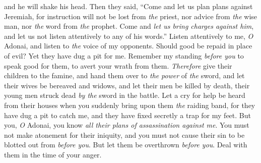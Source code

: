\begin{biblechapter}
and he will shake his head.
 Then they said, “Come and let us plan plans against Jeremiah, for instruction will not be lost from \textit{the} priest, nor advice from \textit{the} wise man, nor \textit{the} word from \textit{the} prophet. Come and \textit{let us bring charges against him}, and let us not listen attentively to any of his words.”
\verse Listen attentively to me, \textit{O} Adonai, 
and listen to \textit{the} voice of my opponents.
\verse Should good be repaid in place of evil? 
Yet they have dug a pit for me. 
Remember my standing \textit{before you} to speak good for them, 
to avert your wrath from them.
\verse \textit{Therefore} give their children to the famine, 
and hand them over to \textit{the} \textit{power} of \textit{the} sword, 
and let their wives be bereaved and widows, 
and let their men be killed by death, 
their young men struck dead 
\textit{by the} sword in the battle.
\verse Let a cry for help be heard from their houses 
when you suddenly bring upon them \textit{the} raiding band, 
for they have dug a pit to catch me, 
and they have fixed secretly a trap for my feet.
\verse But you, \textit{O} Adonai, you know 
\textit{all their plans of assassination against me}. 
You must not make atonement for their iniquity, 
and you must not cause their sin to be blotted out from \textit{before you}. 
But let them be overthrown \textit{before you}. 
Deal with them in the time of your anger.
\end{biblechapter}

